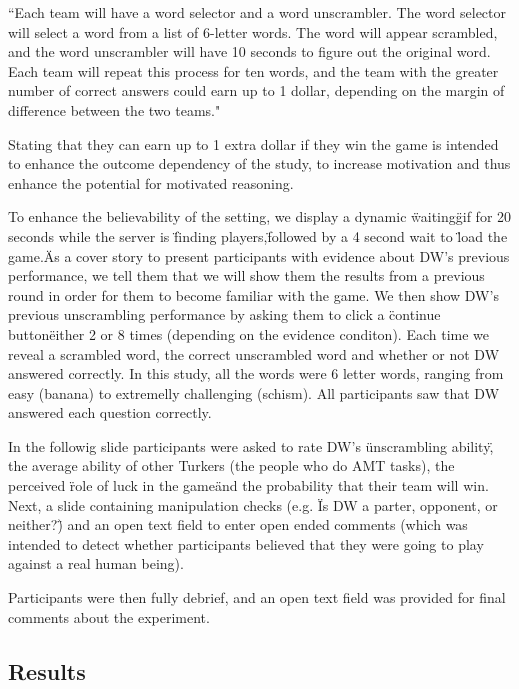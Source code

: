 \documentclass{article}
\begin{document}
``Each team will have a word selector and a word unscrambler. The word selector will select a word from a list of 6-letter words. The word will appear scrambled, and the word unscrambler will have 10 seconds to figure out the original word. Each team will repeat this process for ten words, and the team with the greater number of correct answers could earn up to 1 dollar, depending on the margin of difference between the two teams."

Stating that they can earn up to 1 extra dollar if they win the game is intended to enhance the outcome dependency of the study, to increase motivation and thus enhance the potential for motivated reasoning. 

To enhance the believability of the setting, we display a dynamic \"waiting\" gif for 20 seconds while the server is \"finding players,\" followed by a 4 second wait to \"load the game.\" As a cover story to present participants with evidence about DW's previous performance, we tell them that we will show them the results from a previous round in order for them to become familiar with the game. We then show DW's previous unscrambling performance by asking them to click a \"continue button\" either 2 or 8 times (depending on the evidence conditon). Each time we reveal a scrambled word, the correct unscrambled word and whether or not DW answered correctly. In this study, all the words were 6 letter words, ranging from easy (banana) to extremelly challenging (schism). All participants saw that DW answered each question correctly.

In the followig slide participants were asked to rate DW's \"unscrambling ability\", the average ability of other Turkers (the people who do AMT tasks), the perceived \"role of luck in the game\" and the probability that their team will win. Next, a slide containing manipulation checks (e.g. \"Is DW a parter, opponent, or neither?\") and an open text field to enter open ended comments (which was intended to detect whether participants believed that they were going to play against a real human being).


Participants were then fully debrief, and an open text field was provided for final comments about the experiment. 




\subsection{Results}

\end{document}
